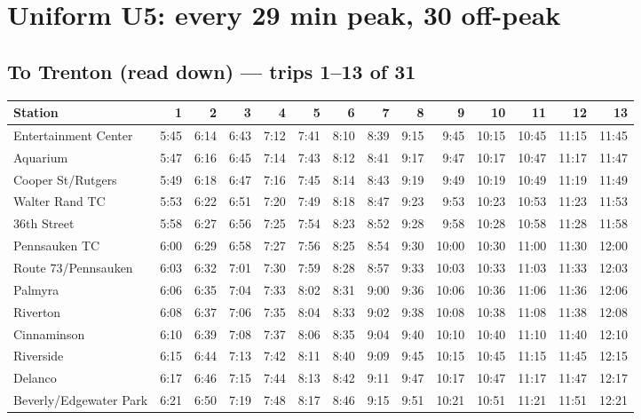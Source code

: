 \section{Uniform U5: every 29 min peak, 30 off-peak}\label{tt:uniform_U5}
\subsection*{To Trenton (read down) --- trips 1--13 of 31}
\begin{center}\footnotesize\setlength{\tabcolsep}{3pt}\begin{tabular}{@{}lrrrrrrrrrrrrr@{}}\toprule
Station & 1 & 2 & 3 & 4 & 5 & 6 & 7 & 8 & 9 & 10 & 11 & 12 & 13 \\\midrule
Entertainment Center & 5:45 & 6:14 & 6:43 & 7:12 & 7:41 & 8:10 & 8:39 & 9:15 & 9:45 & 10:15 & 10:45 & 11:15 & 11:45 \\
Aquarium & 5:47 & 6:16 & 6:45 & 7:14 & 7:43 & 8:12 & 8:41 & 9:17 & 9:47 & 10:17 & 10:47 & 11:17 & 11:47 \\
Cooper St/Rutgers & 5:49 & 6:18 & 6:47 & 7:16 & 7:45 & 8:14 & 8:43 & 9:19 & 9:49 & 10:19 & 10:49 & 11:19 & 11:49 \\
Walter Rand TC & 5:53 & 6:22 & 6:51 & 7:20 & 7:49 & 8:18 & 8:47 & 9:23 & 9:53 & 10:23 & 10:53 & 11:23 & 11:53 \\
36th Street & 5:58 & 6:27 & 6:56 & 7:25 & 7:54 & 8:23 & 8:52 & 9:28 & 9:58 & 10:28 & 10:58 & 11:28 & 11:58 \\
Pennsauken TC & 6:00 & 6:29 & 6:58 & 7:27 & 7:56 & 8:25 & 8:54 & 9:30 & 10:00 & 10:30 & 11:00 & 11:30 & 12:00 \\
Route 73/Pennsauken & 6:03 & 6:32 & 7:01 & 7:30 & 7:59 & 8:28 & 8:57 & 9:33 & 10:03 & 10:33 & 11:03 & 11:33 & 12:03 \\
Palmyra & 6:06 & 6:35 & 7:04 & 7:33 & 8:02 & 8:31 & 9:00 & 9:36 & 10:06 & 10:36 & 11:06 & 11:36 & 12:06 \\
Riverton & 6:08 & 6:37 & 7:06 & 7:35 & 8:04 & 8:33 & 9:02 & 9:38 & 10:08 & 10:38 & 11:08 & 11:38 & 12:08 \\
Cinnaminson & 6:10 & 6:39 & 7:08 & 7:37 & 8:06 & 8:35 & 9:04 & 9:40 & 10:10 & 10:40 & 11:10 & 11:40 & 12:10 \\
Riverside & 6:15 & 6:44 & 7:13 & 7:42 & 8:11 & 8:40 & 9:09 & 9:45 & 10:15 & 10:45 & 11:15 & 11:45 & 12:15 \\
Delanco & 6:17 & 6:46 & 7:15 & 7:44 & 8:13 & 8:42 & 9:11 & 9:47 & 10:17 & 10:47 & 11:17 & 11:47 & 12:17 \\
Beverly/Edgewater Park & 6:21 & 6:50 & 7:19 & 7:48 & 8:17 & 8:46 & 9:15 & 9:51 & 10:21 & 10:51 & 11:21 & 11:51 & 12:21 \\

\end{tabular}
\end{center}
